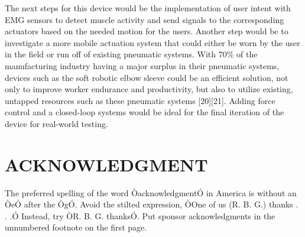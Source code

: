 \documentclass[letterpaper, 10 pt, conference]{ieeeconf}  %
\begin{document}
The next steps for this device would be the implementation of user intent with EMG sensors to detect muscle activity and send signals to the corresponding actuators based on the needed motion for the users.  Another step would be to investigate a more mobile actuation system that could either be worn by the user in the field or run off of existing pneumatic systems.  With 70\% of the manufacturing industry having a major surplus in their pneumatic systems, devices such as the soft robotic elbow sleeve could be an efficient solution, not only to improve worker endurance and productivity, but also to utilize existing, untapped resources such as these pneumatic systems [20][21].  Adding force control and a closed-loop systems would be ideal for the final iteration of the device for real-world testing. 




\addtolength{\textheight}{-12cm}   %








\section*{ACKNOWLEDGMENT}

The preferred spelling of the word ÒacknowledgmentÓ in America is without an ÒeÓ after the ÒgÓ. Avoid the stilted expression, ÒOne of us (R. B. G.) thanks . . .Ó  Instead, try ÒR. B. G. thanksÓ. Put sponsor acknowledgments in the unnumbered footnote on the first page.



\end{document}
